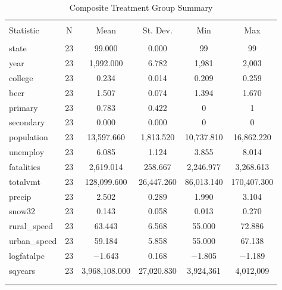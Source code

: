 \documentclass{article}
\begin{document}
\begin{table}[!htbp] \centering 
  \caption{Composite Treatment Group Summary} 
  \label{tab:a21} 
\begin{tabular}{@{\extracolsep{5pt}}lccccc} 
\\[-1.8ex]\hline 
\hline \\[-1.8ex] 
Statistic & \multicolumn{1}{c}{N} & \multicolumn{1}{c}{Mean} & \multicolumn{1}{c}{St. Dev.} & \multicolumn{1}{c}{Min} & \multicolumn{1}{c}{Max} \\ 
\hline \\[-1.8ex] 
state & 23 & 99.000 & 0.000 & 99 & 99 \\ 
year & 23 & 1,992.000 & 6.782 & 1,981 & 2,003 \\ 
college & 23 & 0.234 & 0.014 & 0.209 & 0.259 \\ 
beer & 23 & 1.507 & 0.074 & 1.394 & 1.670 \\ 
primary & 23 & 0.783 & 0.422 & 0 & 1 \\ 
secondary & 23 & 0.000 & 0.000 & 0 & 0 \\ 
population & 23 & 13,597.660 & 1,813.520 & 10,737.810 & 16,862.220 \\ 
unemploy & 23 & 6.085 & 1.124 & 3.855 & 8.014 \\ 
fatalities & 23 & 2,619.014 & 258.667 & 2,246.977 & 3,268.613 \\ 
totalvmt & 23 & 128,099.600 & 26,447.260 & 86,013.140 & 170,407.300 \\ 
precip & 23 & 2.502 & 0.289 & 1.990 & 3.104 \\ 
snow32 & 23 & 0.143 & 0.058 & 0.013 & 0.270 \\ 
rural\_speed & 23 & 63.443 & 6.568 & 55.000 & 72.886 \\ 
urban\_speed & 23 & 59.184 & 5.858 & 55.000 & 67.138 \\ 
logfatalpc & 23 & $-$1.643 & 0.168 & $-$1.805 & $-$1.189 \\ 
sqyears & 23 & 3,968,108.000 & 27,020.830 & 3,924,361 & 4,012,009 \\ 
\hline \\[-1.8ex] 
\normalsize 
\end{tabular} 
\end{table} 
\end{document}

